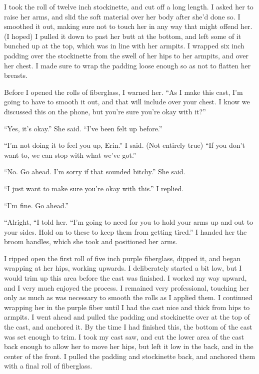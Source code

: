 I took the roll of twelve inch stockinette, and cut off a long length. I asked her to
raise her arms, and slid the soft material over her body after she'd done so. I smoothed it out,
making sure not to touch her in any way that might offend her. (I hoped) I pulled it down to
past her butt at the bottom, and left some of it bunched up at the top, which was in line with
her armpits. I wrapped six inch padding over the stockinette from the swell of her hips to her
armpits, and over her chest. I made sure to wrap the padding loose enough so as not to flatten
her breasts.

Before I opened the rolls of fiberglass, I warned her. ``As I make this cast, I'm going to
have to smooth it out, and that will include over your chest. I know we discussed this on the
phone, but you're sure you're okay with it?''

``Yes, it's okay.'' She said. ``I've been felt up before.''

``I'm not doing it to feel you up, Erin.'' I said. (Not entirely true) ``If you don't want
to, we can stop with what we've got.''

``No. Go ahead. I'm sorry if that sounded bitchy.'' She said.

``I just want to make sure you're okay with this.'' I replied.

``I'm fine. Go ahead.''

``Alright, ``I told her. ``I'm going to need for you to hold your arms up and out to your
sides. Hold on to these to keep them from getting tired.'' I handed her the broom handles, which
she took and positioned her arms.

I ripped open the first roll of five inch purple fiberglass, dipped it, and began wrapping
at her hips, working upwards. I deliberately started a bit low, but I would trim up this area
before the cast was finished. I worked my way upward, and I very much enjoyed the process. I
remained very professional, touching her only as much as was necessary to smooth the rolls as I
applied them. I continued wrapping her in the purple fiber until I had the cast nice and thick
from hips to armpits. I went ahead and pulled the padding and stockinette over at the top of the
cast, and anchored it. By the time I had finished this, the bottom of the cast was set enough to
trim. I took my cast saw, and cut the lower area of the cast back enough to allow her to move
her hips, but left it low in the back, and in the center of the front. I pulled the padding and
stockinette back, and anchored them with a final roll of fiberglass.

